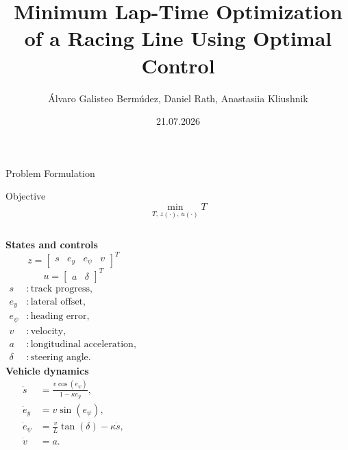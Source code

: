 \documentclass[12pt]{beamer}
\title[Minimum Lap-Time Optimization]{Minimum Lap-Time Optimization of a Racing Line Using Optimal Control}
\author{Álvaro Galisteo Bermúdez, Daniel Rath, Anastasiia Kliushnik}
\date{21.07.2026}
\begin{document}
	\frame{\titlepage}

    \begin{frame}{Problem Formulation}
    \begin{block}{Objective}
        \[
            \min_{T,\,z(\cdot),\,u(\cdot)} T
        \]
    \end{block}
    \small
    \begin{columns}[T,onlytextwidth]
        \textbf{States and controls}
        \[
            z=
            \begin{bmatrix}
                s & e_y & e_\psi & v
            \end{bmatrix}^{T}
        \]
        \[
            u=
            \begin{bmatrix}
                a & \delta
            \end{bmatrix}^{T}
        \]
        \scriptsize
        \[
        \begin{aligned}
            s &: \text{track progress},\\
            e_y &: \text{lateral offset},\\
            e_\psi &: \text{heading error},\\
            v &: \text{velocity},\\
            a &: \text{longitudinal acceleration},\\
            \delta &: \text{steering angle}.
        \end{aligned}
        \]
        \textbf{Vehicle dynamics}
        \[
        \begin{aligned}
            \dot{s}
            &=
            \frac{v\cos(e_\psi)}
            {1-\kappa e_y},
            \\[0.15cm]
            \dot{e}_y
            &=
            v\sin(e_\psi),
            \\[0.15cm]
            \dot{e}_\psi
            &=
            \frac{v}{L}\tan(\delta)
            -
            \kappa\dot{s},
            \\[0.15cm]
            \dot{v}
            &=a.
        \end{aligned}
        \]
    \end{columns}
    \end{frame}
\end{document}
